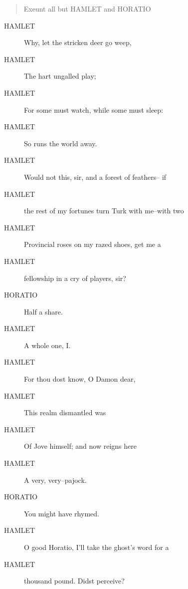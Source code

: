\documentclass{article}
\begin{document}
\begin{quote}
Exeunt all but HAMLET and HORATIO
\end{quote}
          
\begin{description}
            
\item[HAMLET] Why, let the stricken deer go weep,
\item[HAMLET] The hart ungalled play;
\item[HAMLET] For some must watch, while some must sleep:
\item[HAMLET] So runs the world away.
\item[HAMLET] Would not this, sir, and a forest of feathers-- if
\item[HAMLET] the rest of my fortunes turn Turk with me--with two
\item[HAMLET] Provincial roses on my razed shoes, get me a
\item[HAMLET] fellowship in a cry of players, sir?
\end{description}
          
\begin{description}
            
\item[HORATIO] Half a share.
\end{description}
          
\begin{description}
            
\item[HAMLET] A whole one, I.
\item[HAMLET] For thou dost know, O Damon dear,
\item[HAMLET] This realm dismantled was
\item[HAMLET] Of Jove himself; and now reigns here
\item[HAMLET] A very, very--pajock.
\end{description}
          
\begin{description}
            
\item[HORATIO] You might have rhymed.
\end{description}
          
\begin{description}
            
\item[HAMLET] O good Horatio, I'll take the ghost's word for a
\item[HAMLET] thousand pound. Didst perceive?
\end{description}
          
\end{document}
